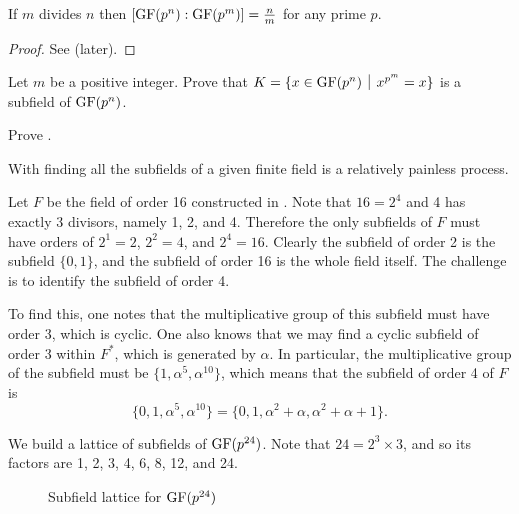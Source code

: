 \begin{corollary}\label{corollary-divisibility-of-finite-field-degree}
    If $m$ divides $n$ then $[\mathrm{GF}(p^n): \mathrm{GF}(p^m)] = \frac nm$ for any prime $p$.
\end{corollary}
\begin{proof}
    See  (later).
\end{proof}

\begin{exercise}\label{exercise-prime-power-elements-idempotent-is-subfield}
    Let $m$ be a positive integer. Prove that $K = \{x \in \GF{p^n} \vert x^{p^m} = x\}$ is a subfield of $\mathrm{GF}(p^n)$.
\end{exercise}

\begin{exercise}\label{exercise-divisibility-of-finite-field-degree}
    Prove .
\end{exercise}

With  finding all the subfields of a given finite field is a relatively painless process.

\begin{example}
    Let $F$ be the field of order 16 constructed in . Note that $16 = 2^4$ and 4 has exactly 3 divisors, namely 1, 2, and 4. Therefore the only subfields of $F$ must have orders of $2^1 = 2$, $2^2 = 4$, and $2^4 = 16$. Clearly the subfield of order 2 is the subfield $\{0, 1\}$, and the subfield of order 16 is the whole field itself. The challenge is to identify the subfield of order 4.

    To find this, one notes that the multiplicative group of this subfield must have order 3, which is cyclic. One also knows that we may find a cyclic subfield of order 3 within $F^\ast$, which is generated by $\alpha$. In particular, the multiplicative group of the subfield must be $\{1, \alpha^5, \alpha^{10}\}$, which means that the subfield of order 4 of $F$ is
    \[
        \{0, 1, \alpha^5, \alpha^{10}\} = \{0, 1, \alpha^2 + \alpha, \alpha^2 + \alpha + 1\}.
    \]
\end{example}

\begin{example}
    We build a lattice of subfields of $\mathrm{GF}(p^{24})$. Note that $24 = 2^3 \times 3$, and so its factors are 1, 2, 3, 4, 6, 8, 12, and 24.

    \begin{figure}[H]
        \centering
        \caption{Subfield lattice for $\mathrm{GF}(p^{24})$}
    \end{figure}
\end{example}

